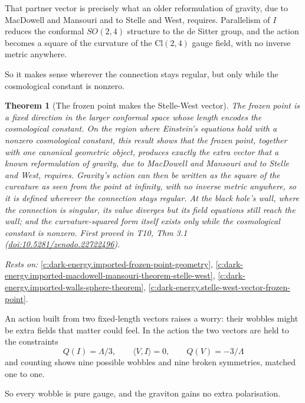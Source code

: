 \documentclass[11pt]{article}
\newtheorem{theorem}{Theorem}[section]
\theoremstyle{definition}
\theoremstyle{plain}
\providecommand{\Cl}{}\renewcommand{\Cl}{\mathrm{Cl}}
\providecommand{\ip}{}\renewcommand{\ip}[2]{\langle #1, #2\rangle}
\begin{document}
That partner vector is precisely what an older reformulation of gravity, due to MacDowell and Mansouri and to Stelle and West, requires. Parallelism of $I$ reduces the conformal $SO(2,4)$ structure to the de Sitter group, and the action becomes a square of the curvature of the $\Cl(2,4)$ gauge field, with no inverse metric anywhere.

So it makes sense wherever the connection stays regular, but only while the cosmological constant is nonzero.

\begin{theorem}[The frozen point makes the Stelle-West vector]\label{c:dark-energy.frozen-point-makes-stelle-west-vector}
The frozen point is a fixed direction in the larger conformal space whose length encodes the cosmological constant. On the region where Einstein's equations hold with a nonzero cosmological constant, this result shows that the frozen point, together with one canonical geometric object, produces exactly the extra vector that a known reformulation of gravity, due to MacDowell and Mansouri and to Stelle and West, requires. Gravity's action can then be written as the square of the curvature as seen from the point at infinity, with no inverse metric anywhere, so it is defined wherever the connection stays regular. At the black hole's wall, where the connection is singular, its value diverges but its field equations still reach the wall; and the curvature-squared form itself exists only while the cosmological constant is nonzero.
\emph{First proved in} T10, Thm 3.1 (\href{https://doi.org/10.5281/zenodo.22722496}{doi:10.5281/zenodo.22722496}).
\end{theorem}
\noindent\emph{Rests on:} \ref{c:dark-energy.imported-frozen-point-geometry}, \ref{c:dark-energy.imported-macdowell-mansouri-theorem-stelle-west}, \ref{c:dark-energy.imported-walls-sphere-theorem}, \ref{c:dark-energy.stelle-west-vector-frozen-point}.

An action built from two fixed-length vectors raises a worry: their wobbles might be extra fields that matter could feel. In the action the two vectors are held to the constraints \[ Q(I) = \Lambda/3 , \qquad \ip{V}{I} = 0 , \qquad Q(V) = -3/\Lambda \] and counting shows nine possible wobbles and nine broken symmetries, matched one to one.

So every wobble is pure gauge, and the graviton gains no extra polarisation.
\end{document}
